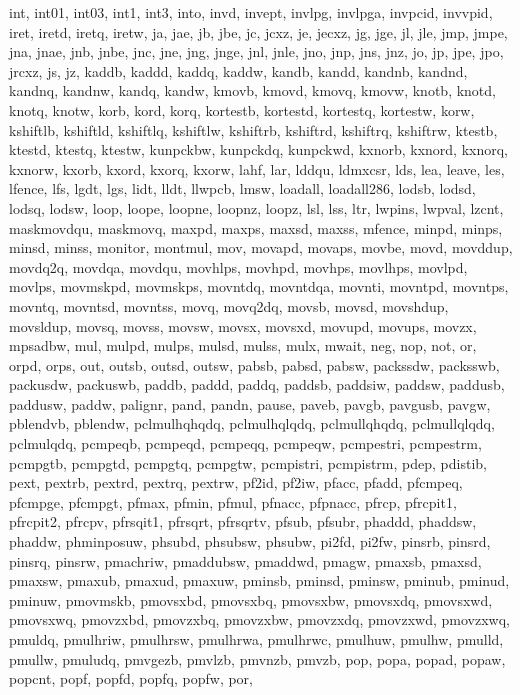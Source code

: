 {{int, int01, int03, int1, int3, into, invd, invept, invlpg, invlpga, invpcid,
invvpid, iret, iretd, iretq, iretw, ja, jae, jb, jbe, jc, jcxz, je, jecxz, jg,
jge, jl, jle, jmp, jmpe, jna, jnae, jnb, jnbe, jnc, jne, jng, jnge, jnl, jnle,
jno, jnp, jns, jnz, jo, jp, jpe, jpo, jrcxz, js, jz, kaddb, kaddd, kaddq, kaddw,
kandb, kandd, kandnb, kandnd, kandnq, kandnw, kandq, kandw, kmovb, kmovd, kmovq,
kmovw, knotb, knotd, knotq, knotw, korb, kord, korq, kortestb, kortestd,
kortestq, kortestw, korw, kshiftlb, kshiftld, kshiftlq, kshiftlw, kshiftrb,
kshiftrd, kshiftrq, kshiftrw, ktestb, ktestd, ktestq, ktestw, kunpckbw,
kunpckdq, kunpckwd, kxnorb, kxnord, kxnorq, kxnorw, kxorb, kxord, kxorq, kxorw,
lahf, lar, lddqu, ldmxcsr, lds, lea, leave, les, lfence, lfs, lgdt, lgs, lidt,
lldt, llwpcb, lmsw, loadall, loadall286, lodsb, lodsd, lodsq, lodsw, loop,
loope, loopne, loopnz, loopz, lsl, lss, ltr, lwpins, lwpval, lzcnt, maskmovdqu,
maskmovq, maxpd, maxps, maxsd, maxss, mfence, minpd, minps, minsd, minss,
monitor, montmul, mov, movapd, movaps, movbe, movd, movddup, movdq2q, movdqa,
movdqu, movhlps, movhpd, movhps, movlhps, movlpd, movlps, movmskpd, movmskps,
movntdq, movntdqa, movnti, movntpd, movntps, movntq, movntsd, movntss, movq,
movq2dq, movsb, movsd, movshdup, movsldup, movsq, movss, movsw, movsx, movsxd,
movupd, movups, movzx, mpsadbw, mul, mulpd, mulps, mulsd, mulss, mulx, mwait,
neg, nop, not, or, orpd, orps, out, outsb, outsd, outsw, pabsb, pabsd, pabsw,
packssdw, packsswb, packusdw, packuswb, paddb, paddd, paddq, paddsb, paddsiw,
paddsw, paddusb, paddusw, paddw, palignr, pand, pandn, pause, paveb, pavgb,
pavgusb, pavgw, pblendvb, pblendw, pclmulhqhqdq, pclmulhqlqdq, pclmullqhqdq,
pclmullqlqdq, pclmulqdq, pcmpeqb, pcmpeqd, pcmpeqq, pcmpeqw, pcmpestri,
pcmpestrm, pcmpgtb, pcmpgtd, pcmpgtq, pcmpgtw, pcmpistri, pcmpistrm, pdep,
pdistib, pext, pextrb, pextrd, pextrq, pextrw, pf2id, pf2iw, pfacc, pfadd,
pfcmpeq, pfcmpge, pfcmpgt, pfmax, pfmin, pfmul, pfnacc, pfpnacc, pfrcp,
pfrcpit1, pfrcpit2, pfrcpv, pfrsqit1, pfrsqrt, pfrsqrtv, pfsub, pfsubr, phaddd,
phaddsw, phaddw, phminposuw, phsubd, phsubsw, phsubw, pi2fd, pi2fw, pinsrb,
pinsrd, pinsrq, pinsrw, pmachriw, pmaddubsw, pmaddwd, pmagw, pmaxsb, pmaxsd,
pmaxsw, pmaxub, pmaxud, pmaxuw, pminsb, pminsd, pminsw, pminub, pminud, pminuw,
pmovmskb, pmovsxbd, pmovsxbq, pmovsxbw, pmovsxdq, pmovsxwd, pmovsxwq, pmovzxbd,
pmovzxbq, pmovzxbw, pmovzxdq, pmovzxwd, pmovzxwq, pmuldq, pmulhriw, pmulhrsw,
pmulhrwa, pmulhrwc, pmulhuw, pmulhw, pmulld, pmullw, pmuludq, pmvgezb, pmvlzb,
pmvnzb, pmvzb, pop, popa, popad, popaw, popcnt, popf, popfd, popfq, popfw, por,
}}
